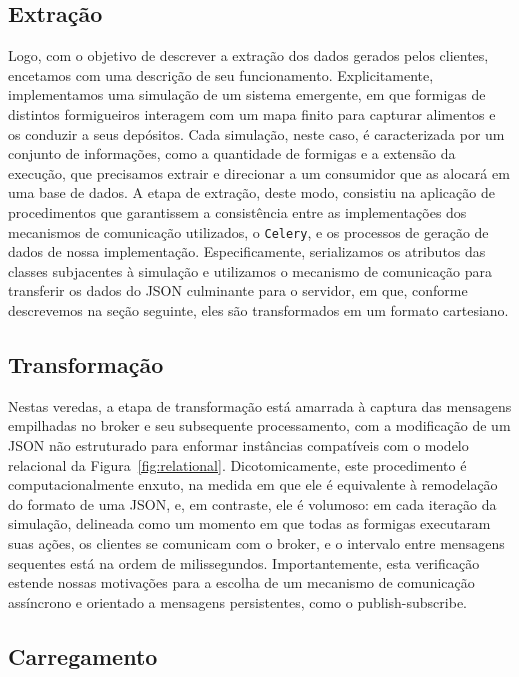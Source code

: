 \documentclass[12pt,oneside,a4paper]{article}
\begin{document}
\subsection{Extração}

Logo, com o objetivo de descrever a extração dos dados gerados pelos clientes, encetamos com uma descrição de seu funcionamento. Explicitamente, implementamos uma simulação de um sistema emergente, em que formigas de distintos formigueiros interagem com um mapa finito para capturar alimentos e os conduzir a seus depósitos. Cada simulação, neste caso, é caracterizada por um conjunto de informações, como a quantidade de formigas e a extensão da execução, que precisamos extrair e direcionar a um consumidor que as alocará em uma base de dados. A etapa de extração, deste modo, consistiu na aplicação de procedimentos que garantissem a consistência entre as implementações dos mecanismos de comunicação utilizados, o \texttt{Celery}, e os processos de geração de dados de nossa implementação. Especificamente, serializamos os atributos das classes subjacentes à simulação e utilizamos o mecanismo de comunicação para transferir os dados do JSON culminante para o servidor, em que, conforme descrevemos na seção seguinte, eles são transformados em um formato cartesiano. 

\subsection{Transformação}

Nestas veredas, a etapa de transformação está amarrada à captura das mensagens empilhadas no broker e seu subsequente processamento, com a modificação de um JSON não estruturado para enformar instâncias compatíveis com o modelo relacional da Figura~\ref{fig:relational}. Dicotomicamente, este procedimento é computacionalmente enxuto, na medida em que ele é equivalente à remodelação do formato de uma JSON, e, em contraste, ele é volumoso: em cada iteração da simulação, delineada como um momento em que todas as formigas executaram suas ações, os clientes se comunicam com o broker, e o intervalo entre mensagens sequentes está na ordem de milissegundos. Importantemente, esta verificação estende nossas motivações para a escolha de um mecanismo de comunicação assíncrono e orientado a mensagens persistentes, como o publish-subscribe. 

\subsection{Carregamento}
\end{document}
